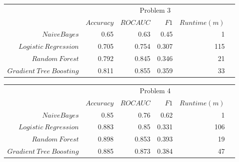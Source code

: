 	\begin{table*}\centering
		\begin{tabular}{@{}rrrrrc@{}} \toprule
			&  \multicolumn{4}{c}{Problem 3} \\
			\cmidrule{2-5}
			& $Accuracy$ & $ROC AUC$ & $F1$ & $Runtime  (m)$ \\ \midrule
			$Naive Bayes$               & 0.65  & 0.63  & 0.45  & 1  \\
			$Logistic \ Regression$     & 0.705 & 0.754 & 0.307 & 115 \\
			$Random \ Forest$            &  0.792 & 0.845 & 0.346 & 21 \\
			$Gradient \ Tree \ Boosting$ & 0.811 & 0.855 & 0.359 & 33 \\

			\bottomrule
		\end{tabular}
	\end{table*}


	\begin{table*}\centering
		\begin{tabular}{@{}rrrrrc@{}} \toprule
			&  \multicolumn{4}{c}{Problem 4} \\
			\cmidrule{2-5}
			& $Accuracy$ & $ROC AUC$ & $F1$ & $Runtime  (m)$ \\ \midrule
			$Naive Bayes$               & 0.85  & 0.76  & 0.62 & 1 \\
			$Logistic \ Regression$     & 0.883 & 0.85  & 0.331 & 106 \\
			$Random \ Forest$            & 0.898 & 0.853 & 0.393 & 19 \\
			$Gradient \ Tree \ Boosting$ & 0.885 & 0.873 & 0.384 & 47 \\

			\bottomrule
		\end{tabular}
	\end{table*}

\medskip

